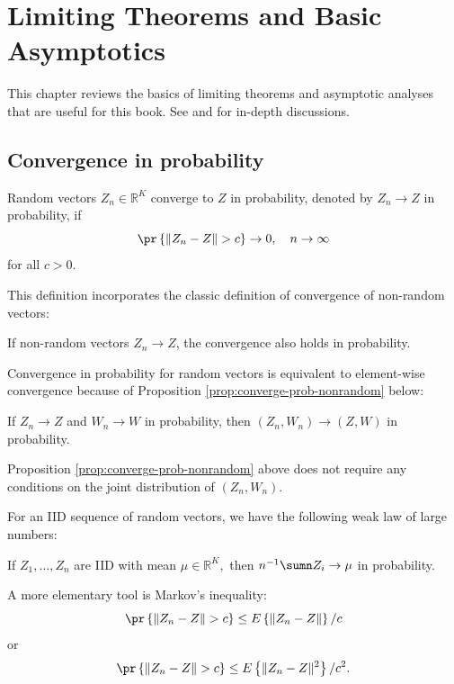  
\chapter{Limiting Theorems and Basic Asymptotics}
\label{chapter::limiting-theorems} 


This chapter reviews the basics of limiting theorems and asymptotic analyses that are useful for this book. See \citet{newey1994large} and \citet{van2000asymptotic} for in-depth discussions. 

\section{Convergence in probability}



\begin{definition}
Random vectors $Z_{n}\in\mathbb{R}^{K}$ converge to $Z$ in probability,
denoted by $Z_{n}\rightarrow Z$ in probability, if 
\[
\pr\left\{ \|Z_{n}-Z\|>c\right\} \rightarrow0,\quad n\rightarrow\infty 
\]
for all $c>0$. 
\end{definition}


This definition incorporates the classic definition of convergence
of non-random vectors:
\begin{proposition}
If non-random vectors $Z_{n}\rightarrow Z$, the convergence also
holds in probability.
\end{proposition}
%
Convergence in probability for random vectors is equivalent to element-wise
convergence because of Proposition \ref{prop:converge-prob-nonrandom} below:

\begin{proposition}\label{prop:converge-prob-nonrandom}
If $Z_{n}\rightarrow Z$ and $W_{n}\rightarrow W$ in probability,
then $(Z_{n},W_{n})\rightarrow(Z,W)$ in probability. 
\end{proposition}


Proposition \ref{prop:converge-prob-nonrandom} above does not require any conditions on the joint distribution of $(Z_n, W_n)$. 


For an IID sequence of random vectors, we have the following weak law of
large numbers:
\begin{proposition}
If $Z_{1},\ldots,Z_{n}$ are \textup{IID} with mean $\mu\in\mathbb{R}^{K},$
then $  n^{-1}\sumn Z_{i}\rightarrow\mu$ in probability. 
\end{proposition}

A more elementary tool is Markov's inequality:
\begin{equation}
\pr\left\{ \|Z_{n}-Z\|>c\right\} \leq E\left\{ \|Z_{n}-Z\|\right\} /c\label{eq:1stmoment}
\end{equation}
or 
\begin{equation}
\pr\left\{ \|Z_{n}-Z\|>c\right\} \leq E\left\{ \|Z_{n}-Z\|^{2}\right\} /c^{2}.\label{eq:2ndmoment}
\end{equation}

